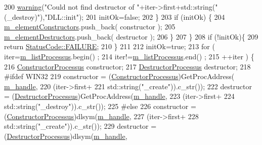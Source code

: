 \begin{DoxyCode}
200       \hyperlink{classDLL_a4bbc341bad623eedb5c228c91ce2e858}{warning}(\textcolor{stringliteral}{"Could not find destructor of "}+iter->first+std::string(\textcolor{stringliteral}{" (\_destroy)"}),\textcolor{stringliteral}{"DLL::init"});
201       initOk=\textcolor{keyword}{false};
202     \}
203     \textcolor{keywordflow}{if} (initOk) \{
204       \hyperlink{classDLL_a7ee65d305f4f6014f6499d69f162d024}{m\_elementConstructors}.push\_back( constructor );
205       \hyperlink{classDLL_a5004587b4dac5d0ccb0ab99b167ef159}{m\_elementDestructors}.push\_back( destructor );
206     \}
207   \}
208   \textcolor{keywordflow}{if} (!initOk)\{
209     \textcolor{keywordflow}{return} \hyperlink{classStatusCode_a6f565cbeadc76d14c72f047e5e85eb4ba3da73d4c469762eb9d3c960368252b26}{StatusCode::FAILURE};
210   \}
211 
212   initOk=\textcolor{keyword}{true};
213   \textcolor{keywordflow}{for} ( iter=\hyperlink{classDLL_a197e92b990184a27a74f4a0456897bd5}{m\_listProcessus}.begin() ;
214         iter!=\hyperlink{classDLL_a197e92b990184a27a74f4a0456897bd5}{m\_listProcessus}.end() ;
215         ++iter ) \{
216     \hyperlink{classDLL_afbf4c85f3517962642944b80833a3607}{ConstructorProcessus} constructor;
217     \hyperlink{classDLL_a203a61b2a683e2751b5f3fe5a7187a7e}{DestructorProcessus} destructor;
218 \textcolor{preprocessor}{#ifdef WIN32
}
219     constructor = (\hyperlink{classDLL_afbf4c85f3517962642944b80833a3607}{ConstructorProcessus})GetProcAddress(
      \hyperlink{classDLL_a2ca22015aef35c5d61f8daaf3c070154}{m\_handle},
220                                                        (iter->first+
221                                                         std::string(\textcolor{stringliteral}{"\_create"})).c\_str());
222     destructor = (\hyperlink{classDLL_a203a61b2a683e2751b5f3fe5a7187a7e}{DestructorProcessus})GetProcAddress(\hyperlink{classDLL_a2ca22015aef35c5d61f8daaf3c070154}{m\_handle},
223                                                      (iter->first+
224                                                       std::string(\textcolor{stringliteral}{"\_destroy"})).c\_str());
225 \textcolor{preprocessor}{#else
}
226     constructor = (\hyperlink{classDLL_afbf4c85f3517962642944b80833a3607}{ConstructorProcessus})dlsym(\hyperlink{classDLL_a2ca22015aef35c5d61f8daaf3c070154}{m\_handle},
227                                              (iter->first+
228                                              std::string(\textcolor{stringliteral}{"\_create"})).c\_str());
229     destructor = (\hyperlink{classDLL_a203a61b2a683e2751b5f3fe5a7187a7e}{DestructorProcessus})dlsym(\hyperlink{classDLL_a2ca22015aef35c5d61f8daaf3c070154}{m\_handle},

\end{DoxyCode}
